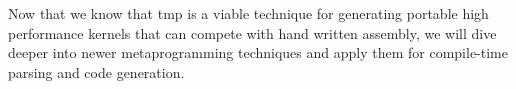 \documentclass[../main]{subfiles}
\begin{document}
Now that we know that \gls{tmp} is a viable technique for generating
portable high performance kernels that can compete with hand written assembly,
we will dive deeper into newer \cpp metaprogramming techniques and apply them
for compile-time parsing and code generation.

\end{document}
